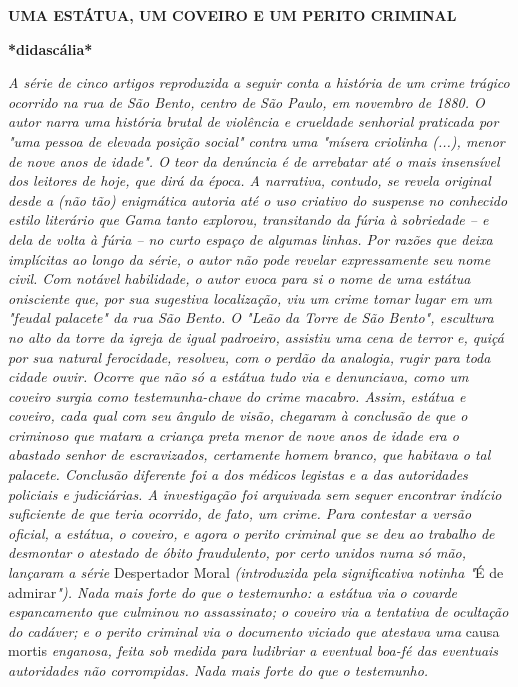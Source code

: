 \textbf{UMA ESTÁTUA, UM
COVEIRO E UM PERITO CRIMINAL}

\textbf{*didascália*}

\emph{A série de cinco artigos reproduzida a seguir conta a história de
um crime trágico ocorrido na rua de São Bento, centro de São Paulo, em
novembro de 1880. O autor narra uma história brutal de violência e
crueldade senhorial praticada por "uma pessoa de elevada posição social"
contra uma "mísera criolinha (...), menor de nove anos de idade". O teor
da denúncia é de arrebatar até o mais insensível dos leitores de hoje,
que dirá da época. A narrativa, contudo, se revela original desde a (não
tão) enigmática autoria até o uso criativo do suspense no conhecido
estilo literário que Gama tanto explorou, transitando da fúria à
sobriedade -- e dela de volta à fúria -- no curto espaço de algumas
linhas. Por razões que deixa implícitas ao longo da série, o autor não
pode revelar expressamente seu nome civil. Com notável habilidade, o
autor evoca para si o nome de uma estátua onisciente que, por sua
sugestiva localização, viu um crime tomar lugar em um "feudal palacete"
da rua São Bento. O "Leão da Torre de São Bento", escultura no alto da
torre da igreja de igual padroeiro, assistiu uma cena de terror e, quiçá
por sua natural ferocidade, resolveu, com o perdão da analogia, rugir
para toda cidade ouvir. Ocorre que não só a estátua tudo via e
denunciava, como um coveiro surgia como testemunha-chave do crime
macabro. Assim, estátua e coveiro, cada qual com seu ângulo de visão,
chegaram à conclusão de que o criminoso que matara a criança preta menor
de nove anos de idade era o abastado senhor de escravizados, certamente
homem branco, que habitava o tal palacete. Conclusão diferente foi a dos
médicos legistas e a das autoridades policiais e judiciárias. A
investigação foi arquivada sem sequer encontrar indício suficiente de
que teria ocorrido, de fato, um crime. Para contestar a versão oficial,
a estátua, o coveiro, e agora o perito criminal que se deu ao trabalho
de desmontar o atestado de óbito fraudulento, por certo unidos numa só
mão, lançaram a série} Despertador Moral \emph{(introduzida pela
significativa notinha "}É de admirar\emph{"). Nada mais forte do que o
testemunho: a estátua via o covarde espancamento que culminou no
assassinato; o coveiro via a tentativa de ocultação do cadáver; e o
perito criminal via o documento viciado que atestava uma} causa mortis
\emph{enganosa, feita sob medida para ludibriar a eventual boa-fé das
eventuais autoridades não corrompidas. Nada mais forte do que o
testemunho.}

